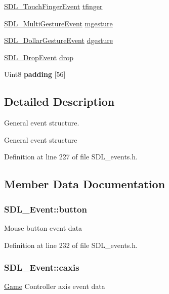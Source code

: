 \begin{DoxyCompactItemize}
\item 
\hyperlink{structSDL__TouchFingerEvent}{S\+D\+L\+\_\+\+Touch\+Finger\+Event} \hyperlink{unionSDL__Event_ab18d7d60794cb056948ffa58541bc3c5}{tfinger}
\item 
\hyperlink{structSDL__MultiGestureEvent}{S\+D\+L\+\_\+\+Multi\+Gesture\+Event} \hyperlink{unionSDL__Event_ac19b3c6a6b5181a51eb4fbe2cbe726a9}{mgesture}
\item 
\hyperlink{structSDL__DollarGestureEvent}{S\+D\+L\+\_\+\+Dollar\+Gesture\+Event} \hyperlink{unionSDL__Event_a4481167b9f8549aeb254e97ca812e74d}{dgesture}
\item 
\hyperlink{structSDL__DropEvent}{S\+D\+L\+\_\+\+Drop\+Event} \hyperlink{unionSDL__Event_acff77bccbca65abbb876360a3f5209c9}{drop}
\item 
\hypertarget{unionSDL__Event_aca74efe7c73dae4c74f4cdc5170047d4}{Uint8 {\bfseries padding} \mbox{[}56\mbox{]}}\label{unionSDL__Event_aca74efe7c73dae4c74f4cdc5170047d4}

\end{DoxyCompactItemize}


\subsection{Detailed Description}
General event structure. 

General event structure 

Definition at line 227 of file S\+D\+L\+\_\+events.\+h.



\subsection{Member Data Documentation}
\hypertarget{unionSDL__Event_ab6da2fa2687e5f849f270adecc64785f}{
\subsubsection[{button}]{ S\+D\+L\+\_\+\+Event\+::button}}\label{unionSDL__Event_ab6da2fa2687e5f849f270adecc64785f}
Mouse button event data 

Definition at line 232 of file S\+D\+L\+\_\+events.\+h.

\hypertarget{unionSDL__Event_aa8f6df0f2716fae56204b12ab4a4c289}{
\subsubsection[{caxis}]{ S\+D\+L\+\_\+\+Event\+::caxis}}\label{unionSDL__Event_aa8f6df0f2716fae56204b12ab4a4c289}
\hyperlink{classGame}{Game} Controller axis event data 

